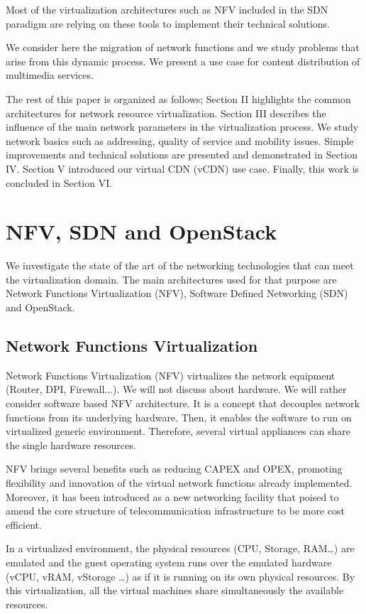 \documentclass[letterpaper,conference]{IEEEtran}
\begin{document}
Most of the virtualization architectures such as NFV
included in the SDN paradigm are relying on these tools to
implement their technical solutions.

We consider here the migration of network functions and
we study problems that arise from this dynamic process. We
present a use case for content distribution of multimedia
services.

The rest of this paper is organized as follows; Section II
highlights the common architectures for network resource
virtualization. Section III describes the influence of the main network parameters in the virtualization process. We study network basics such as addressing, quality of service and mobility issues. Simple improvements and technical solutions are presented and demonstrated in Section IV. Section V introduced our virtual CDN (vCDN) use case. Finally, this work is concluded in Section VI.

\section{NFV, SDN and OpenStack}

We investigate the state of the art of the networking
technologies that can meet the virtualization domain. The
main architectures used for that purpose are Network
Functions Virtualization (NFV), Software Defined
Networking (SDN) and OpenStack.

\subsection{Network Functions Virtualization}

Network Functions Virtualization (NFV) \cite{[1]} virtualizes the network equipment (Router, DPI, Firewall...). We will not discuss about hardware. We will rather consider software based NFV architecture. It is a concept that decouples network functions from its underlying hardware. Then, it enables the software to run on virtualized generic environment. Therefore, several virtual appliances can share the single hardware resources.

NFV brings several benefits \cite{[2]} such as reducing CAPEX and OPEX, promoting flexibility and innovation of the virtual network functions already implemented. Moreover, it has been introduced as a new networking facility that poised to amend the core structure of telecommunication infrastructure to be more cost efficient.

In a virtualized environment, the physical resources (CPU,
Storage, RAM…) are emulated and the guest operating system
runs over the emulated hardware (vCPU, vRAM, vStorage …)
as if it is running on its own physical resources. By this
virtualization, all the virtual machines share simultaneously the available resources.
\end{document}

